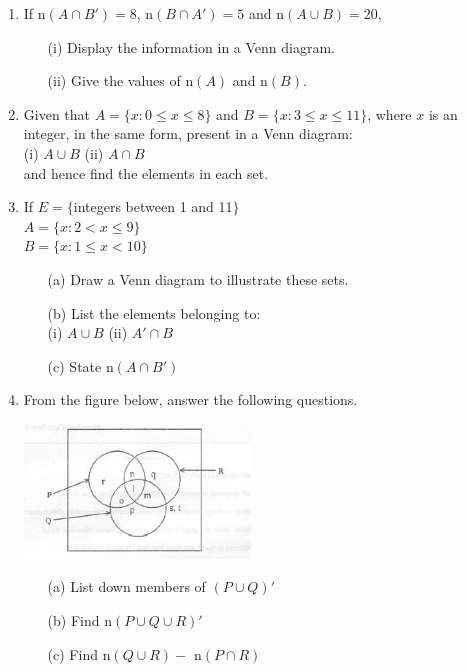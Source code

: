 \begin{enumerate}
	\item If n$(A \cap B') = 8$, n$(B \cap A') = 5$ and n$(A \cup B) = 20$, 
		\begin{itemize}
		\item[(i)] Display the information in a Venn diagram.
		\item[(ii)] Give the values of n$(A)$ and n$(B)$.
		\end{itemize}
		
	\item Given that $A = \{x:0 \leq x \leq 8\}$ and $B = \{x:3 \leq x \leq 11\}$, where $x$ is an integer, in the same form, present in a Venn diagram:\\
	(i) $A \cup B$ \quad (ii) $A \cap B$\\
	and hence find the elements in each set.
	
	\item If $E = \{$integers between 1 and 11$\}$\\
	$A = \{x:2 < x \leq 9\}$\\
	$B = \{x:1 \leq x < 10\}$
		\begin{itemize}
		\item[(a)] Draw a Venn diagram to illustrate these sets.
		\item[(b)] List the elements belonging to:\\
			(i) $A \cup B$ \quad (ii) $A' \cap B$
		\item[(c)] State n$(A \cap B')$
		\end{itemize}
		
	\item From the figure below, answer the following questions.
	
	\begin{center}
	\includegraphics[width=6cm]{./img/set1.jpg}
	\end{center}
	
	\begin{itemize}
	\item[(a)] List down members of $(P \cup Q)'$
	\item[(b)] Find n$(P \cup Q \cup R)'$
	\item[(c)] Find n$(Q \cup R) - $ n$(P \cap R)$
	\end{itemize}
	

\end{enumerate}
